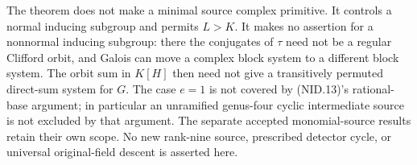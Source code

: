 The theorem does not make a minimal source complex primitive.
It controls a normal inducing subgroup and permits $L>K$.
It makes no assertion for a nonnormal inducing subgroup:
there the conjugates of $\tau$ need not be a regular Clifford
orbit, and Galois can move a complex block system to a different
block system.  The orbit sum in $K[H]$ then need not give a
transitively permuted direct-sum system for $G$.
The case $e=1$ is not covered by (NID.13)'s rational-base
argument; in particular an unramified genus-four cyclic
intermediate source is not excluded by that argument.
The separate accepted monomial-source results retain their
own scope.  No new rank-nine source, prescribed detector cycle,
or universal original-field descent is asserted here.

